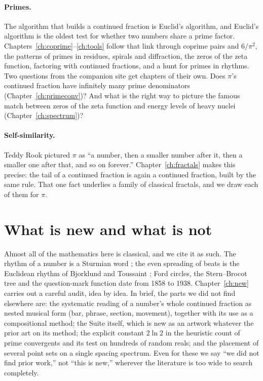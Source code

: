 \paragraph{Primes.} The algorithm that builds a continued fraction is Euclid's algorithm, and Euclid's algorithm is the oldest test for whether two numbers share a prime factor. Chapters~\ref{ch:coprime}--\ref{ch:tools} follow that link through coprime pairs and $6/\pi^2$, the patterns of primes in residues, spirals and diffraction, the zeros of the zeta function, factoring with continued fractions, and a hunt for primes in rhythms. Two questions from the companion site get chapters of their own. Does $\pi$'s continued fraction have infinitely many prime denominators (Chapter~\ref{ch:primeconv})? And what is the right way to picture the famous match between zeros of the zeta function and energy levels of heavy nuclei (Chapter~\ref{ch:spectrum})?

\paragraph{Self-similarity.} Teddy Rook pictured $\pi$ as ``a number, then a smaller number after it, then a smaller one after that, and so on forever.'' Chapter~\ref{ch:fractals} makes this precise: the tail of a continued fraction is again a continued fraction, built by the same rule. That one fact underlies a family of classical fractals, and we draw each of them for $\pi$.

\section{What is new and what is not}

Almost all of the mathematics here is classical, and we cite it as such. The rhythm of a number is a Sturmian word \citep{Lothaire2002}; the even spreading of beats is the Euclidean rhythm of Bjorklund and Toussaint \citep{Toussaint2005}; Ford circles, the Stern--Brocot tree and the question-mark function date from 1858 to 1938. Chapter~\ref{ch:new} carries out a careful audit, idea by idea. In brief, the parts we did not find elsewhere are: the systematic reading of a number's whole continued fraction as nested musical form (bar, phrase, section, movement), together with its use as a compositional method; the Suite itself, which is new as an artwork whatever the prior art on its method; the explicit constant $2\ln 2$ in the heuristic count of prime convergents and its test on hundreds of random reals; and the placement of several point sets on a single spacing spectrum. Even for these we say ``we did not find prior work,'' not ``this is new,'' wherever the literature is too wide to search completely.

